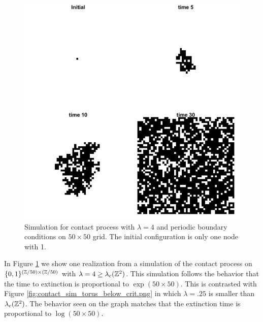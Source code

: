 \begin{figure}[H]
  \centering
    \includegraphics[width=.80\textwidth]{figures/contact_simulation_torus_25.png}
   \caption{Simulation for contact process with $\lambda = 4$ and periodic boundary conditions on $50 \times 50$ grid. The initial configuration is only one node with 1.}
  \label{fig:contact_sim_torus_above_crit.png}
\end{figure}

In Figure \ref{fig:contact_sim_torus_above_crit.png} we show one realization from a simulation of the contact process on $\{0,1\}^{(\mathbb{Z}/50) \times (\mathbb{Z}/50)}$ with $\lambda = 4 \geq \lambda_c(\mathbb{Z}^2)$.
This simulation follows the behavior that the time to extinction is proportional to $\exp(50 \times 50)$.
This is contrasted with Figure \ref{fig:contact_sim_torus_below_crit.png} in which $\lambda = .25$ is smaller than $\lambda_c(\mathbb{Z}^2)$.
The behavior seen on the graph matches that the extinction time is proportional to $\log(50 \times 50)$.

